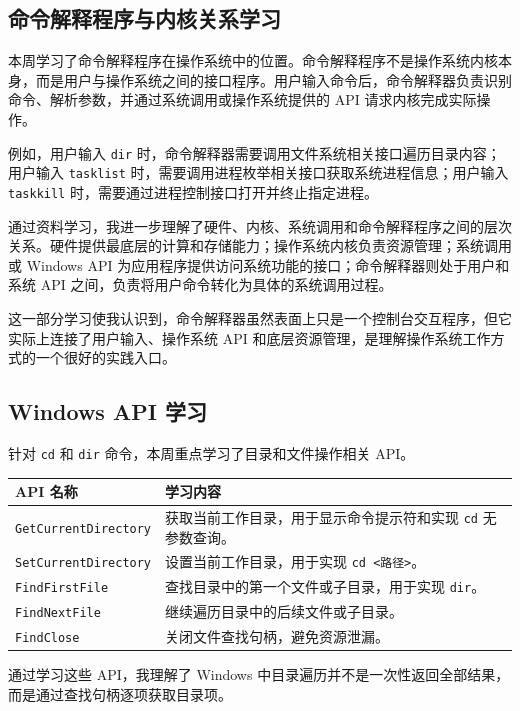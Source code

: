 \documentclass[UTF8]{ctexart}
\begin{document}
\subsection{命令解释程序与内核关系学习}

本周学习了命令解释程序在操作系统中的位置。命令解释程序不是操作系统内核本身，而是用户与操作系统之间的接口程序。用户输入命令后，命令解释器负责识别命令、解析参数，并通过系统调用或操作系统提供的 API 请求内核完成实际操作。

例如，用户输入 \texttt{dir} 时，命令解释器需要调用文件系统相关接口遍历目录内容；用户输入 \texttt{tasklist} 时，需要调用进程枚举相关接口获取系统进程信息；用户输入 \texttt{taskkill} 时，需要通过进程控制接口打开并终止指定进程。

通过资料学习，我进一步理解了硬件、内核、系统调用和命令解释程序之间的层次关系。硬件提供最底层的计算和存储能力；操作系统内核负责资源管理；系统调用或 Windows API 为应用程序提供访问系统功能的接口；命令解释器则处于用户和系统 API 之间，负责将用户命令转化为具体的系统调用过程。

这一部分学习使我认识到，命令解释器虽然表面上只是一个控制台交互程序，但它实际上连接了用户输入、操作系统 API 和底层资源管理，是理解操作系统工作方式的一个很好的实践入口。

\subsection{Windows API 学习}

针对 \texttt{cd} 和 \texttt{dir} 命令，本周重点学习了目录和文件操作相关 API。

\begin{longtable}{p{5cm}p{9cm}}
\toprule
API 名称 & 学习内容 \\
\midrule
\texttt{GetCurrentDirectory} & 获取当前工作目录，用于显示命令提示符和实现 \texttt{cd} 无参数查询。 \\
\texttt{SetCurrentDirectory} & 设置当前工作目录，用于实现 \texttt{cd <路径>}。 \\
\texttt{FindFirstFile} & 查找目录中的第一个文件或子目录，用于实现 \texttt{dir}。 \\
\texttt{FindNextFile} & 继续遍历目录中的后续文件或子目录。 \\
\texttt{FindClose} & 关闭文件查找句柄，避免资源泄漏。 \\
\bottomrule
\end{longtable}

通过学习这些 API，我理解了 Windows 中目录遍历并不是一次性返回全部结果，而是通过查找句柄逐项获取目录项。
\end{document}
